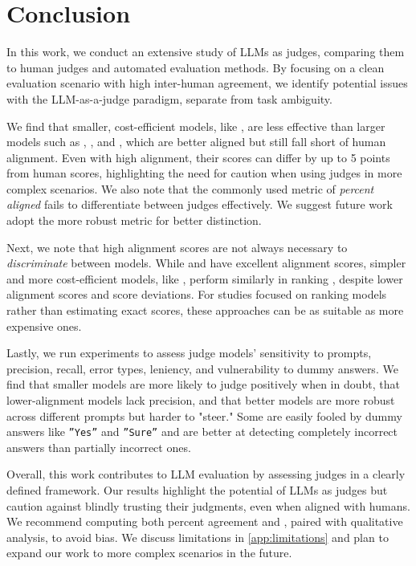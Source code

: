 \section {Conclusion}\label{sec:conclusion}

In this work, we conduct an extensive study of LLMs as judges, comparing them to human judges and automated evaluation methods. By focusing on a clean evaluation scenario with high inter-human agreement, we identify potential issues with the LLM-as-a-judge paradigm, separate from task ambiguity.

We find that smaller, cost-efficient models, like , are less effective than larger models such as \judge{\gpt}, , and , which are better aligned but still fall short of human alignment. Even with high alignment, their scores can differ by up to 5 points from human scores, highlighting the need for caution when using judges in more complex scenarios. We also note that the commonly used metric of \textit{percent aligned} fails to differentiate between judges effectively. We suggest future work adopt the more robust \scottspi metric for better distinction.

Next, we note that high alignment scores are not always necessary to \textit{discriminate} between models. While \judge{\gpt} and  have excellent alignment scores, simpler and more cost-efficient models, like , perform similarly in ranking \evaluatormodels, despite lower alignment scores and score deviations. For studies focused on ranking models rather than estimating exact scores, these approaches can be as suitable as more expensive ones.

Lastly, we run experiments to assess judge models' sensitivity to prompts, precision, recall, error types, leniency, and vulnerability to dummy answers. We find that smaller models are more likely to judge positively when in doubt, that lower-alignment models lack precision, and that better models are more robust across different prompts but harder to "steer." Some \judgemodels are easily fooled by dummy answers like \texttt{''Yes''} and \texttt{''Sure''} and are better at detecting completely incorrect answers than partially incorrect ones.

Overall, this work contributes to LLM evaluation by assessing judges in a clearly defined framework. Our results highlight the potential of LLMs as judges but caution against blindly trusting their judgments, even when aligned with humans. We recommend computing both percent agreement and \scottspi, paired with qualitative analysis, to avoid bias. We discuss limitations in \cref{app:limitations} and plan to expand our work to more complex scenarios in the future.

